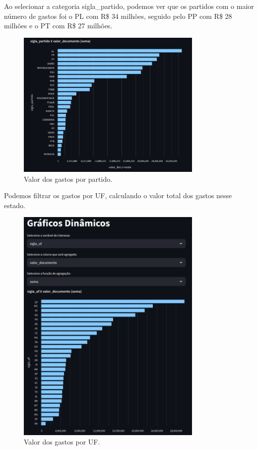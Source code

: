 \documentclass[12pt, a4paper]{article}
\begin{document}
Ao selecionar a categoria sigla\_partido, podemos ver que os partidos com o maior número de gastos foi o PL com R\$ 34 milhões, seguido pelo PP com R\$ 28 milhões e o PT com R\$ 27 milhões.

\begin{figure}[!htbp]
	\centering
	\includegraphics[width=0.8\textwidth]{assets/2_plot6.png}
	\caption{Valor dos gastos por partido.}
	\label{fig:criacao_postgresql}
\end{figure}

Podemos filtrar os gastos por UF, calculando o valor total dos gastos nesse estado.

\begin{figure}[!htbp]
	\centering
	\includegraphics[width=0.8\textwidth]{assets/2_plot7.png}
	\caption{Valor dos gastos por UF.}
	\label{fig:criacao_postgresql}
\end{figure}
\newpage
\end{document}
